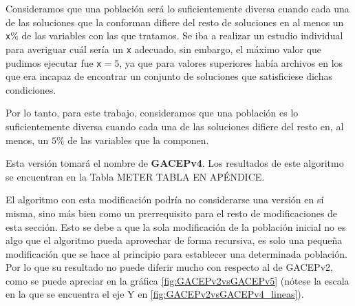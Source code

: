 Consideramos que una población será lo suficientemente diversa cuando cada una de las soluciones que la conforman difiere del resto de soluciones en al menos un \texttt{x}\% de las variables con las que tratamos. 
Se iba a realizar un estudio individual para averiguar cuál sería un \texttt{x} adecuado, sin embargo, el máximo valor que pudimos ejecutar fue \texttt{x}$=5$, ya que para valores superiores había archivos en los que era incapaz de encontrar un conjunto de soluciones que satisficiese dichas condiciones. 

Por lo tanto, para este trabajo, consideramos que una población es lo suficientemente diversa cuando cada una de las soluciones difiere del resto en, al menos, un $5\%$ de las variables que la componen. 

Esta versión tomará el nombre de \textbf{GACEPv4}. 
Los resultados de este algoritmo se encuentran en la Tabla \color{red}METER TABLA EN APÉNDICE\color{black}.

El algoritmo con esta modificación podría no considerarse una versión en sí misma, sino más bien como un prerrequisito para el resto de modificaciones de esta sección. 
Esto se debe a que la sola modificación de la población inicial no es algo que el algoritmo pueda aprovechar de forma recursiva, es solo una pequeña modificación que se hace al principio para establecer una determinada población. 
Por lo que su resultado no puede diferir mucho con respecto al de GACEPv2, como se puede apreciar en la gráfica \ref{fig:GACEPv2vsGACEPv5} (nótese la escala en la que se encuentra el eje Y en \ref{fig:GACEPv2vsGACEPv4_lineas}). 

